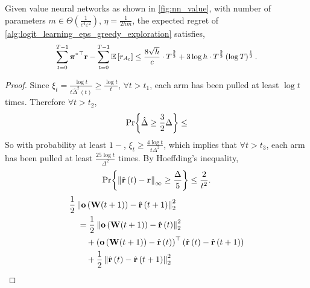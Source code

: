 \begin{thm}
\label{thm:logit_learning_main_result}
    Given value neural networks as shown in \cref{fig:nn_value}, with number of parameters $m \in \Theta\left( \frac{1}{c^4 \varepsilon^2} \right)$, $\eta = \frac{1}{2 h m}$, the expected regret of \cref{alg:logit_learning_eps_greedy_exploration} satisfies,
\begin{equation*}
\small
\begin{split}
    \sum\limits_{t=0}^{T-1}{ {\rvpi^*}^\top \rvr } - \sum\limits_{t=0}^{T-1}{ \sE \left[ r_{A_t} \right] } \le \frac{8 \sqrt{h}}{c} \cdot T^{\frac{2}{3}} + 3 \log{h} \cdot T^{\frac{2}{3}} \left(\log{T}\right)^{\frac{1}{3}}.
\end{split}
\end{equation*}
\end{thm}
\begin{proof}
    Since $\xi_t = \frac{\log{t}}{t \hat{\Delta}^2\left(t\right)} \ge \frac{\log{t}}{t}$, $\forall t > t_1$, each arm has been pulled at least $\log{t}$ times. Therefore $\forall t > t_2$,
\begin{equation*}
\begin{split}
    {\text{Pr}}{\left\{ \hat{\Delta} \ge \frac{3}{2} \Delta \right\}} \le 
\end{split}
\end{equation*}
So with probability at least $1 - $, $\xi_t \ge \frac{4 \log{t}}{t \Delta^2}$, which implies that $\forall t > t_3$,  each arm has been pulled at least $\frac{25\log{t}}{\Delta^2}$ times. By Hoeffding's inequality,
\begin{equation*}
\begin{split}
    {\text{Pr}}{\left\{ \left\| \hat{{\mathbf{r}}}\left(t\right) - {\mathbf{r}}\right\|_\infty \ge \frac{\Delta}{5} \right\}} \le \frac{2}{t^2}.
\end{split}
\end{equation*}
\begin{equation*}
\begin{split}
    &\frac{1}{2} \left\| \rvo\left( \rmW(t+1) \right) - \hat{\rvr}\left(t+1\right)\right\|_2^2 \\
    &\quad = \frac{1}{2} \left\| \rvo\left( \rmW(t+1) \right) - \hat{\rvr}\left(t\right)\right\|_2^2 \\
    &\qquad + \left( \rvo\left( \rmW(t+1) \right) - \hat{\rvr}\left(t\right) \right)^\top \left( \hat{\rvr}\left(t\right) - \hat{\rvr}\left(t+1\right) \right) \\
    &\qquad + \frac{1}{2} \left\| \hat{\rvr}\left(t\right) - \hat{\rvr}\left(t+1\right) \right\|_2^2 \\

\end{split}
\end{equation*}
\end{proof}
